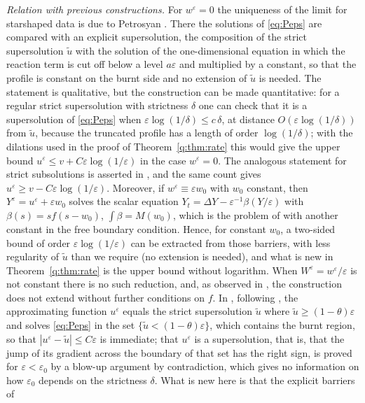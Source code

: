 \documentclass[11pt]{amsart}
\theoremstyle{definition}
\theoremstyle{remark}
\newcommand{\ve}{\varepsilon}
\begin{document}
\emph{Relation with previous constructions.} For $w^\ve=0$ the uniqueness of the limit
for starshaped data is due to Petrosyan \cite{Petrosyan2002}. There
\cite[Proposition~2.5]{Petrosyan2002} the solutions of \eqref{eq:Peps} are compared with
an explicit supersolution, the composition of the strict supersolution $\tilde u$ with the
solution of the one-dimensional equation in which the reaction term is cut off below a
level $a\ve$ and multiplied by a constant, so that the profile is constant on the burnt
side and no extension of $\tilde u$ is needed. The statement is qualitative, but the
construction can be made quantitative: for a regular strict supersolution with
strictness $\delta$ one can check that it is a supersolution of \eqref{eq:Peps} when
$\ve\log(1/\delta)\le c\,\delta$, at distance $O(\ve\log(1/\delta))$ from $\tilde u$, because the
truncated profile has a length of order $\log(1/\delta)$; with the dilations used in the
proof of Theorem~\ref{q:thm:rate} this would give the upper bound $u^\ve\le v+C\ve\log(1/\ve)$ in the case
$w^\ve=0$. The analogous statement for strict subsolutions is asserted in
\cite[Remark~2.6]{Petrosyan2002}, and the same count gives
$u^\ve\ge v-C\ve\log(1/\ve)$. Moreover, if $w^\ve\equiv\ve w_0$ with $w_0$ constant, then
$Y^\ve=u^\ve+\ve w_0$ solves the scalar equation $Y_t=\Delta Y-\ve^{-1}\beta(Y/\ve)$ with
$\beta(s)=sf(s-w_0)$, $\int\beta=M(w_0)$, which is the problem of
\cite{CaffarelliVazquez1995,Petrosyan2002} with another constant in the free boundary
condition. Hence, for constant $w_0$, a two-sided bound of order $\ve\log(1/\ve)$ can be
extracted from those barriers, with less regularity of $\tilde u$ than we require (no
extension is needed), and what is new in Theorem~\ref{q:thm:rate} is the upper bound
without logarithm. When $W^\ve=w^\ve/\ve$ is not constant there is no such reduction, and, as
observed in \cite{FernandezBonderWolanski2004}, the construction does not extend without
further conditions on $f$.
In \cite{FernandezBonderWolanski2004}, following
\cite{LedermanVazquezWolanski2001}, the approximating function $u^\ve$ equals the strict
supersolution $\tilde u$ where $\tilde u\ge(1-\theta)\ve$ and solves \eqref{eq:Peps} in the
set $\{\tilde u<(1-\theta)\ve\}$, which contains the burnt region, so that $|u^\ve-\tilde u|\le C\ve$ is immediate; that
$u^\ve$ is a supersolution, that is, that the jump of its gradient across the boundary of
that set has the right sign, is proved for $\ve<\ve_0$ by a blow-up argument by
contradiction, which gives no information on how $\ve_0$ depends on the strictness
$\delta$. What is new here is that the explicit barriers of
\end{document}
